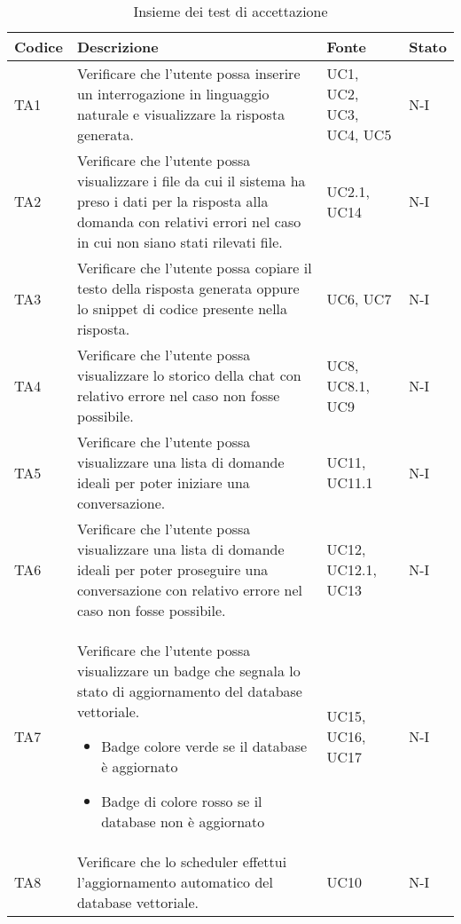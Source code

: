 \begin{table}[h!]
    \centering
    \renewcommand{\arraystretch}{1.5} %
    \begin{tabularx}{\textwidth}{|p{}|X|p{}|p{}|}\hline
    \rowcolor[HTML]{FFD700}
    \textbf{Codice} & \textbf{Descrizione} & \textbf{Fonte} & \textbf{Stato} \\ \hline
    TA1 & Verificare che l'utente possa inserire un interrogazione in linguaggio naturale e visualizzare la risposta generata. & UC1, UC2, UC3, UC4, UC5 & N-I \\ \hline
    TA2 & Verificare che l'utente possa visualizzare i file da cui il sistema ha preso i dati per la risposta alla domanda con relativi errori nel caso in cui non siano stati rilevati file.  & UC2.1, UC14 & N-I \\ \hline
    TA3 & Verificare che l'utente possa copiare il testo della risposta generata oppure lo snippet di codice presente nella risposta. & UC6, UC7 & N-I \\ \hline
    TA4 & Verificare che l'utente possa visualizzare lo storico della chat con relativo errore nel caso non fosse possibile.  & UC8, UC8.1, UC9 & N-I \\ \hline
    TA5 & Verificare che l'utente possa visualizzare una lista di domande ideali per poter iniziare una conversazione. & UC11, UC11.1 & N-I \\ \hline
    TA6 & Verificare che l'utente possa visualizzare una lista di domande ideali per poter proseguire una conversazione con relativo errore nel caso non fosse possibile. & UC12, UC12.1, UC13 & N-I \\ \hline
    TA7 & Verificare che l'utente possa visualizzare un badge che segnala lo stato di aggiornamento del database vettoriale.
    \begin{itemize}
        \item Badge colore verde se il database è aggiornato
        \item Badge di colore rosso se il database non è aggiornato
    \end{itemize} 
        & UC15, UC16, UC17 & N-I \\ \hline
    TA8 & Verificare che lo scheduler effettui l'aggiornamento automatico del database vettoriale. & UC10 & N-I \\ \hline

    \end{tabularx}
    \caption{Insieme dei test di accettazione}
\end{table}




